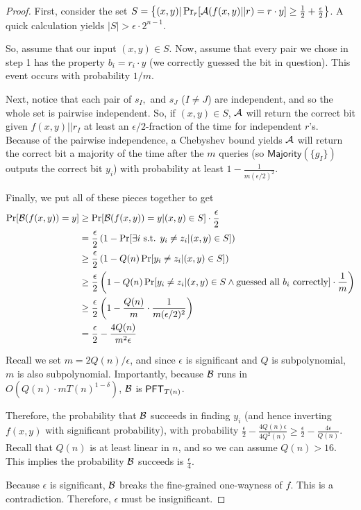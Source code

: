 \begin{proof}
	First, consider the set $S = \left\{ (x,y) | \Pr_r[\mathcal{A}(f(x,y)||r) = r\cdot y] \ge \frac 1 2 + \frac \epsilon 2 \right\}$. A quick calculation yields $|S| > \epsilon\cdot 2^{n-1}$.
	
	So, assume that our input $(x,y) \in S$. Now, assume that every pair we chose in step 1 has the property $b_i = r_i \cdot y$ (we correctly guessed the bit in question). This event occurs with probability $1/m$.
	
	Next, notice that each pair of $s_I,$ and $s_{J}$ ($I \neq J$) are independent, and so the whole set is pairwise independent. So, if $(x, y)\in S$, $\mathcal{A}$ will return the correct bit given $f(x,y)||r_I$ at least an $\epsilon/2$-fraction of the time for independent $r$'s. Because of the pairwise independence, a Chebyshev bound yields $\mathcal{A}$ will return the correct bit a majority of the time after the $m$ queries (so $\mathsf{Majority}(\{g_I\})$ outputs the correct bit $y_i$) with probability at least $1-\frac 1 {m(\epsilon/2)^2}$.
	
	Finally, we put all of these pieces together to get
	\begin{align*}
	\Pr[{\cal B}(f(x,y)) = y] & \ge \Pr[{\cal B}(f(x,y)) = y | (x,y)\in S ] \cdot \frac \epsilon 2\\
	&= \frac \epsilon 2 \left( 1 - \Pr[\exists i \mbox{ s.t. } y_i \neq z_i | (x,y) \in S] \right)\\
	&\ge \frac \epsilon 2 \left(1 - Q(n)\Pr[y_i \neq z_i | (x,y) \in S]\right)\\
	&\ge \frac \epsilon 2 \left(1 - Q(n)\Pr[y_i \neq z_i | (x,y) \in S \land \mbox{guessed all $b_i$ correctly}]\cdot \frac 1 m\right)\\
	&\ge \frac \epsilon 2 \left(1 - \frac {Q(n)}{m} \cdot \frac{1}{m(\epsilon/2)^2} \right)\\
	&= \frac \epsilon 2 - \frac{4Q(n)}{m^2\epsilon}
	\end{align*}
	
	Recall we set $m = 2Q(n)/\epsilon$, and since $\epsilon$ is significant and $Q$ is subpolynomial, $m$ is also subpolynomial. Importantly, because ${\cal B}$ runs in $O(Q(n) \cdot m T(n)^{1-\delta})$, ${\cal B}$ is $\mathsf{PFT}_{T(n)}$.
	
	Therefore, the probability that ${\cal B}$ succeeds in finding $y_i$ (and hence inverting $f(x,y)$ with significant probability), with probability $\frac \epsilon 2 - \frac{4 Q(n)\epsilon}{4Q^2(n)} \ge  \frac \epsilon 2 - \frac{4\epsilon}{Q(n)}$. Recall that $Q(n)$ is at least linear in $n$, and so we can assume $Q(n) > 16$. This implies the probability ${\cal B}$ succeeds is $\frac \epsilon 4$. 
	
	Because $\epsilon$ is significant, ${\cal B}$ breaks the fine-grained one-wayness of $f$. This is a contradiction. Therefore, $\epsilon$ must be insignificant.
\end{proof}

